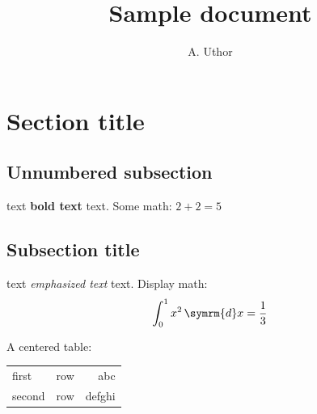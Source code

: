 \documentclass[a4paper,11pt]{article}
\title{Sample document}
\author{A. Uthor}
\begin{document}
\maketitle

\section{Section title}
\subsection*{Unnumbered subsection}
text \textbf{bold text} text. Some math: $2+2=5$
\subsection{Subsection title}
text \emph{emphasized text} text. Display math:
\[
\int_0^1 x^2 \,\symrm{d}x = \frac{1}{3}
\]

A centered table:
\begin{center}
\begin{tabular}{|l|c|r|}
\hline
first  &  row  &  abc \\
second &  row  &  defghi \\
\hline
\end{tabular}
\end{center}
\end{document}
